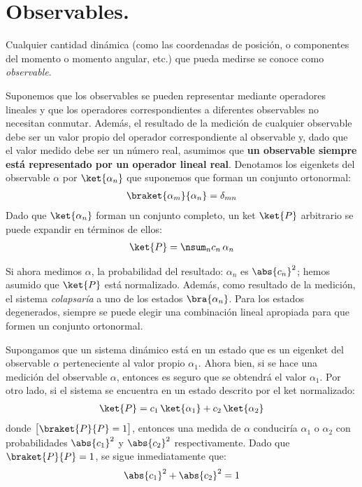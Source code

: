 \section{Observables.}

Cualquier cantidad dinámica (como las coordenadas de posición, o componentes del momento o momento angular, etc.) que pueda medirse se conoce como \emph{observable}.
\par
Suponemos que los observables se pueden representar mediante operadores lineales y que los operadores correspondientes a diferentes observables no necesitan conmutar. Además, el resultado de la medición de cualquier observable debe ser un valor propio del operador correspondiente al observable y, dado que el valor medido debe ser un número real, asumimos que \textbf{un observable siempre está representado por un operador lineal real}. Denotamos los eigenkets del observable $\alpha$ por $\ket{\alpha_{n}}$ que suponemos que forman un conjunto ortonormal:
\begin{align*}
\braket{\alpha_{m}}{\alpha_{n}} = \delta_{mn}
\end{align*}
Dado que $\ket{\alpha_{n}}$ forman un conjunto completo, un ket $\ket{P}$ arbitrario se puede expandir en términos de ellos:
\begin{align*}
\ket{P} = \nsum_{n} c_{n} \, \alpha_{n}
\end{align*}

Si ahora medimos $\alpha$, la probabilidad del resultado: $\alpha_{n}$ es $\abs{c_{n}}^{2}$; hemos asumido que $\ket{P}$ está normalizado. Además, como resultado de la medición, el sistema \emph{colapsaría} a uno de los estados $\bra{\alpha_{n}}$. Para los estados degenerados, siempre se puede elegir una combinación lineal apropiada para que formen un conjunto ortonormal.
\par
Supongamos que un sistema dinámico está en un estado que es un eigenket del observable $\alpha$ perteneciente al valor propio $\alpha_{1}$. Ahora bien, si se hace una medición del observable $\alpha$, entonces es seguro que se obtendrá el valor $\alpha_{1}$. Por otro lado, si el sistema se encuentra en un estado descrito por el ket normalizado:
\begin{align*}
\ket{P} = c_{1} \, \ket{\alpha_{1}} + c_{2} \, \ket{\alpha_{2}}
\end{align*}
donde $\big[ \braket{P}{P} = 1 \big]$, entonces una medida de $\alpha$ conduciría $\alpha_{1}$ o $\alpha_{2}$ con probabilidades $\abs{c_{1}}^{2}$ y $\abs{c_{2}}^{2}$ respectivamente. Dado que $\braket{P}{P} = 1$, se sigue inmediatamente que:
\begin{align}
\abs{c_{1}}^{2} + \abs{c_{2}}^{2} = 1
\end{align}

